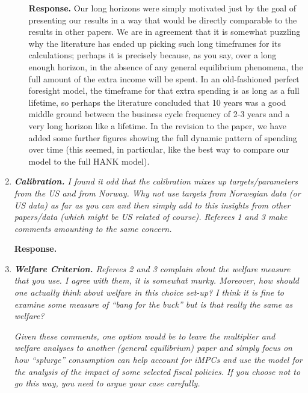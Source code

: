 \documentclass[12pt,letterpaper,english]{article}
\begin{document}
\begin{enumerate}
\begin{itemize}
          \noindent \textbf{Response.} Our long horizons were simply motivated just by the goal of presenting our results in a way that would be directly comparable to the results in other papers.  We are in agreement that it is somewhat puzzling why the literature has ended up picking such long timeframes for its calculations; perhaps it is precisely because, as you say, over a long enough horizon, in the absence of any general equilibrium phenomena, the full amount of the extra income will be spent. In an old-fashioned perfect foresight model, the timeframe for that extra spending is as long as a full lifetime, so perhaps the literature concluded that 10 years was a good middle ground between the business cycle frequency of 2-3 years and a very long horizon like a lifetime.
          In the revision to the paper, we have added some further figures showing the full dynamic pattern of spending over time (this seemed, in particular, like the best way to compare our model to the full HANK model).
	
\end{itemize}



\item \textit{\textbf{Calibration.} I found it odd that the calibration mixes up targets/parameters from the US and from Norway. Why not use targets from Norwegian data (or US data) as far as you can and then simply add to this insights from other papers/data
(which might be US related of course). Referees 1 and 3 make comments amounting to the same concern.}	

\noindent \textbf{Response.} 

\item \textit{\textbf{Welfare Criterion.} Referees 2 and 3 complain about the welfare measure that you use. I agree with them, it is somewhat murky. Moreover, how should one	actually think about welfare in this choice set-up? I think it is fine to examine some	measure of ``bang for the buck'' but is that really the same as welfare?} 

\textit{Given these comments, one option would be to leave the multiplier and welfare	analyses to another (general equilibrium) paper and simply focus on how ``splurge''	consumption can help account for iMPCs and use the model for the analysis of the impact of some selected fiscal policies. If you choose not to go this way, you need to argue your case carefully.}	


\end{enumerate}
\end{document}
